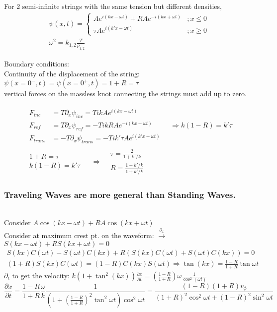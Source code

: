 \documentclass[twoside, 10pt]{amsart}
\begin{document}
For 2 semi-infinite strings with the same tension but different densities,
\[
\begin{gathered}
  \psi(x,t) = \begin{cases} 
    A e^{i (kx-\omega t)} + RA e^{-i(kx+\omega t) } & ; x \leq 0 \\
    \tau A e^{i(k'x-\omega t) } & ; x \geq 0 
  \end{cases} \\
  \omega^2 = k_{1,2} \frac{T}{\rho_{1,2}}
\end{gathered}
\]

Boundary conditions: \\
 Continuity of the displacement of the string: $\psi(x=0^-,t) = \psi(x=0^+,t) = 1+R = \tau $ \\
 vertical forces on the massless knot connecting the strings must add up to zero.  

\[
\begin{gathered}
  \begin{aligned}
    F_{inc} & = T \partial_x \psi_{inc} = T ik A e^{i(kx-\omega t) } \\
    F_{ref} & = T \partial_x \psi_{ref} = -T ik R A e^{-i(kx+\omega t) } \\
    F_{trans} & = -T \partial_x \psi_{trans} = -T ik' \tau A e^{i(k'x-\omega t) } 
  \end{aligned} \quad \Longrightarrow k(1-R) = k' \tau  \\
  \begin{gathered}
    1 +R = \tau \\
    k(1-R) = k' \tau 
  \end{gathered} \quad \, \Longrightarrow 
  \begin{aligned}
    & \tau = \frac{2}{ 1 + k'/k} \\
    & R = \frac{1-k'/k }{1+k'/k}
  \end{aligned}
\end{gathered}
\]

\subsubsection{Traveling Waves are more general than Standing Waves.} \quad \\
Consider $A\cos{ (kx-\omega t) } + RA \cos{ (kx+\omega t) }$ \\
Consider at maximum crest pt. on the waveform: $\xrightarrow{\partial_x}$ $S(kx-\omega t) + RS(kx +\omega t) = 0$ \\
\[
\begin{gathered}
  S(kx) C(\omega t) - S(\omega t)C(kx) + R(S(kx)C(\omega t) + S(\omega t) C(kx) ) = 0 \\
  (1+R)S(kx)C(\omega t) = (1-R)C(kx)S(\omega t) \Longrightarrow \tan{(kx)} = \frac{1-R}{1+R} \tan{\omega t}
\end{gathered}
\]
$\partial_t$ to get the velocity: $k(1+\tan^2{(kx)} )\frac{ \partial x}{ \partial t} = \left( \frac{1-R}{1+R} \right) \omega \frac{1}{ \cos^2{(\omega t) } } $ 
\[
\frac{ \partial x}{ \partial t} = \frac{1-R}{1+R} \frac{ \omega }{k} \frac{1}{ \left( 1 + \left( \frac{1-R}{1+R} \right)^2 \tan^2{ \omega t} \right) \cos^2{ \omega t } } = \frac{ (1-R)(1+R) v_{\phi} }{ (1+R)^2 \cos^2{ \omega t}+ (1-R)^2 \sin^2{ \omega t } }
\]
\end{document}
